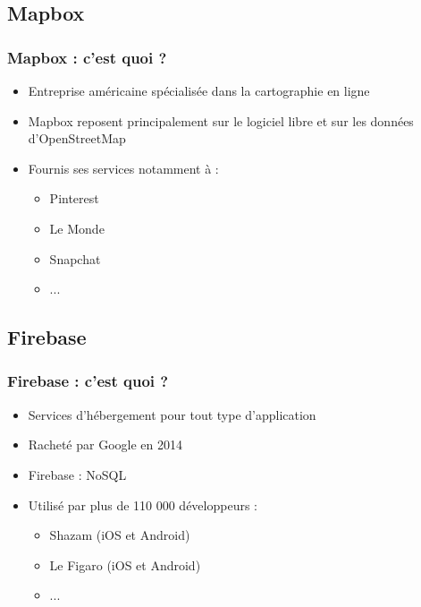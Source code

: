 \documentclass{beamer}
\begin{document}
\subsection{Mapbox}
  \begin{frame}
    \frametitle{Mapbox : c'est quoi ?}

    \begin{itemize}
      \item Entreprise américaine spécialisée dans la cartographie en ligne
      \item Mapbox reposent principalement sur le logiciel libre et sur les données d'OpenStreetMap
      \item Fournis ses services notamment à :
      \begin{itemize}
        \item Pinterest
        \item Le Monde
        \item Snapchat
        \item ...
      \end{itemize}
    \end{itemize}

  \end{frame}

    

\subsection{Firebase}
  \begin{frame}
    \frametitle{Firebase : c'est quoi ?}

    \begin{itemize}
      \item Services d'hébergement pour tout type d'application
      \item Racheté par Google en 2014
      \item Firebase : NoSQL
      \item Utilisé par plus de 110 000 développeurs :
      \begin{itemize}
        \item Shazam (iOS et Android)
        \item Le Figaro (iOS et Android)
        \item ...
      \end{itemize}
    \end{itemize}

  \end{frame}
\end{document}
